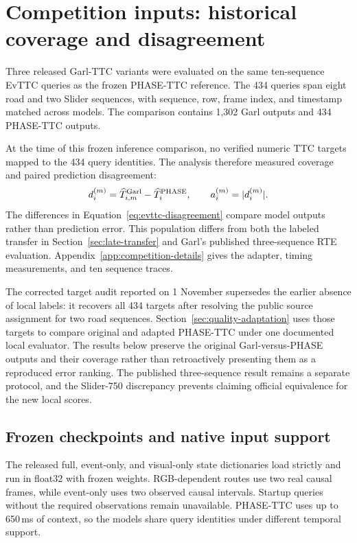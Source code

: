 \section{Competition inputs: historical coverage and disagreement}
\label{sec:evttc-competition}
Three released Garl-TTC variants were evaluated on the same ten-sequence EvTTC queries as the frozen PHASE-TTC reference. The 434 queries span eight road and two Slider sequences, with sequence, row, frame index, and timestamp matched across models. The comparison contains 1,302 Garl outputs and 434 PHASE-TTC outputs. 

At the time of this frozen inference comparison, no verified numeric TTC targets mapped to the 434 query identities. The analysis therefore measured coverage and paired prediction disagreement:
\begin{equation}
d_i^{(m)}=\widehat T_{i,m}^{\rm Garl}-\widehat T_i^{\rm PHASE},\qquad a_i^{(m)}=|d_i^{(m)}|.
\label{eq:evttc-disagreement}
\end{equation}
The differences in Equation~\ref{eq:evttc-disagreement} compare model outputs rather than prediction error. This population differs from both the labeled transfer in Section~\ref{sec:late-transfer} and Garl's published three-sequence RTE evaluation. Appendix~\ref{app:competition-details} gives the adapter, timing measurements, and ten sequence traces.

The corrected target audit reported on 1 November supersedes the earlier absence of local labels: it recovers all 434 targets after resolving the public source assignment for two road sequences. Section~\ref{sec:quality-adaptation} uses those targets to compare original and adapted PHASE-TTC under one documented local evaluator. The results below preserve the original Garl-versus-PHASE outputs and their coverage rather than retroactively presenting them as a reproduced error ranking. The published three-sequence result remains a separate protocol, and the Slider-750 discrepancy prevents claiming official equivalence for the new local scores. 

\subsection{Frozen checkpoints and native input support}
The released full, event-only, and visual-only state dictionaries load strictly and run in float32 with frozen weights. RGB-dependent routes use two real causal frames, while event-only uses two observed causal intervals. Startup queries without the required observations remain unavailable. PHASE-TTC uses up to 650\,ms of context, so the models share query identities under different temporal support. 

